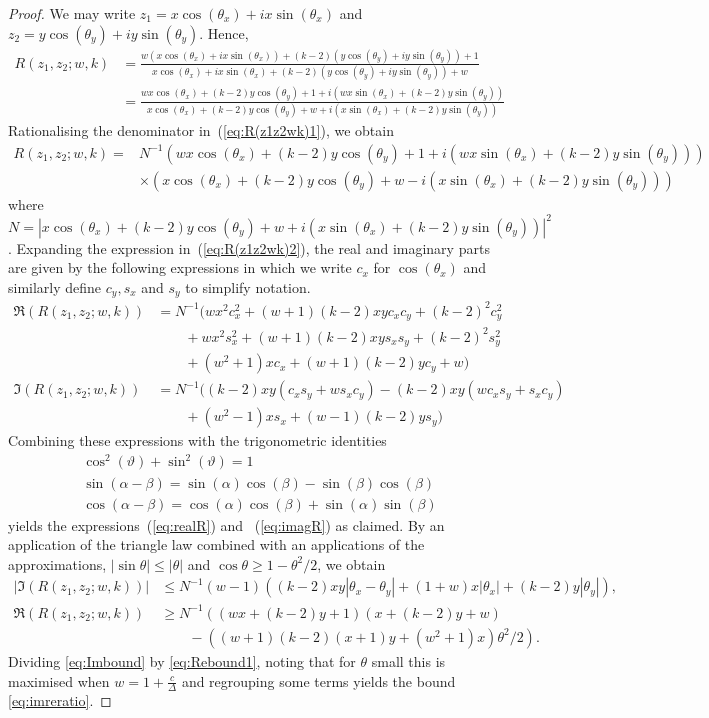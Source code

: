 \documentclass[10pt,a4paper]{article}
\theoremstyle{definition}
\newcommand{\thx}{\theta_x}
\newcommand{\thy}{\theta_y}
\begin{document}
\begin{proof}
 We may write $z_1 = x\cos(\thx) +ix\sin(\thx)$ and $z_2 = y\cos(\thy) +iy\sin(\thy)$. Hence,
 \begin{align}
  \nonumber R(z_1,z_2;w,k) & = \frac{w(x\cos(\thx) +ix\sin(\thx)) +(k-2)(y\cos(\thy) +iy\sin(\thy)) +1}{x\cos(\thx) +ix\sin(\thx) +(k-2)(y\cos(\thy) +iy\sin(\thy)) +w} \\
  & = \frac{wx\cos(\thx) +(k-2)y\cos(\thy) +1 + i(wx\sin(\thx) + (k-2)y\sin(\thy))}{x\cos(\thx) +(k-2)y\cos(\thy) +w + i(x\sin(\thx) + (k-2)y\sin(\thy))} \label{eq:R(z1z2wk)1}
 \end{align}
Rationalising the denominator in~(\ref{eq:R(z1z2wk)1}), we obtain
\begin{align}
 \nonumber R(z_1,z_2;w,k) = & N^{-1}\left(wx\cos(\thx) +(k-2)y\cos(\thy) +1 + i(wx\sin(\thx) + (k-2)y\sin(\thy))\right)\\
 & \times \left(x\cos(\thx) +(k-2)y\cos(\thy) +w - i(x\sin(\thx) + (k-2)y\sin(\thy))\right) \label{eq:R(z1z2wk)2}
\end{align}
where $N = |x\cos(\thx) +(k-2)y\cos(\thy) +w + i(x\sin(\thx) + (k-2)y\sin(\thy))|^2$.
Expanding the expression in~(\ref{eq:R(z1z2wk)2}), the real and imaginary parts are given by the following expressions in which we write $c_x$ for $\cos(\thx)$ and similarly define $c_y,s_x$ and $s_y$ to simplify notation.
 \begin{align*}
  \Re(R(z_1,z_2;w,k)) &= N^{-1}(wx^2c_x^2+(w+1)(k-2)xyc_xc_y+(k-2)^2c_y^2 \\
  &\qquad + wx^2s_x^2 + (w+1)(k-2)xys_xs_y+(k-2)^2s_y^2\\
  &\qquad +(w^2+1)xc_x+(w+1)(k-2)yc_y+w)\\
  \Im(R(z_1,z_2;w,k)) &= N^{-1}((k-2)xy(c_xs_y+ws_xc_y) - (k-2)xy(wc_xs_y+s_xc_y)\\
  &\qquad + (w^2-1)xs_x+(w-1)(k-2)ys_y )
 \end{align*}
Combining these expressions with the trigonometric identities
\begin{gather*}
 \cos^2(\vartheta)+\sin^2(\vartheta) = 1 \\
 \sin(\alpha-\beta) = \sin(\alpha)\cos(\beta)-\sin(\beta)\cos(\beta) \\
 \cos(\alpha-\beta) = \cos(\alpha)\cos(\beta)+\sin(\alpha)\sin(\beta)
\end{gather*}
yields the expressions~(\ref{eq:realR}) and ~(\ref{eq:imagR}) as claimed.
%
By an application of the triangle law combined with an applications of the approximations, $|\sin\theta| \leq |\theta|$ and $\cos\theta \geq 1-\theta^2/2$, we obtain
\begin{align}
 |\Im(R(z_1,z_2;w,k))| &\leq N^{-1} (w-1)\left((k-2)xy|\thx-\thy|+(1+w)x|\thx|+(k-2)y|\thy|\right), \label{eq:Imbound} \\
 \Re(R(z_1,z_2;w,k)) &\geq N^{-1} \left((wx+(k-2)y+1)(x+(k-2)y+w) \right.\nonumber\\ 
&\qquad -\left. ((w+1)(k-2)(x+1)y+(w^2+1)x)\theta^2/2\right). \label{eq:Rebound1}
\end{align}
Dividing \eqref{eq:Imbound} by \eqref{eq:Rebound1}, noting that for $\theta$ small this is maximised when $w = 1+\frac{c}{\Delta}$ and regrouping some terms yields the bound \eqref{eq:imreratio}.
%
%
%
%
%
\end{proof}
\end{document}
